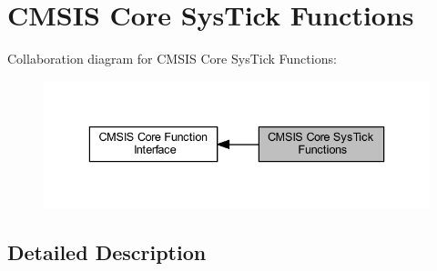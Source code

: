 \hypertarget{group___c_m_s_i_s___core___sys_tick_functions}{}\section{C\+M\+S\+IS Core Sys\+Tick Functions}
\label{group___c_m_s_i_s___core___sys_tick_functions}
Collaboration diagram for C\+M\+S\+IS Core Sys\+Tick Functions\+:\nopagebreak
\begin{figure}[H]
\begin{center}
\leavevmode
\includegraphics[width=336pt]{group___c_m_s_i_s___core___sys_tick_functions}
\end{center}
\end{figure}


\subsection{Detailed Description}
